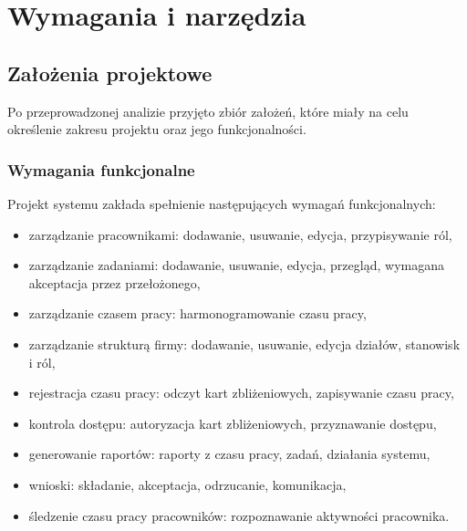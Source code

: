 \chapter{Wymagania i narzędzia}
\label{ch:wymagania-i-narzedzia}


\section{Założenia projektowe}


Po przeprowadzonej analizie przyjęto zbiór założeń, które miały na celu określenie zakresu projektu oraz jego funkcjonalności.

\subsection{Wymagania funkcjonalne}

Projekt systemu zakłada spełnienie następujących wymagań funkcjonalnych:


\begin{itemize}
    \item zarządzanie pracownikami: dodawanie, usuwanie, edycja, przypisywanie ról,
    \item zarządzanie zadaniami: dodawanie, usuwanie, edycja, przegląd, wymagana akceptacja przez przełożonego,
    \item zarządzanie czasem pracy: harmonogramowanie czasu pracy,
    \item zarządzanie strukturą firmy: dodawanie, usuwanie, edycja działów, stanowisk i ról,
    \item rejestracja czasu pracy: odczyt kart zbliżeniowych, zapisywanie czasu pracy,
    \item kontrola dostępu: autoryzacja kart zbliżeniowych, przyznawanie dostępu,
    \item generowanie raportów: raporty z czasu pracy, zadań, działania systemu,
    \item wnioski: składanie, akceptacja, odrzucanie, komunikacja,
    \item śledzenie czasu pracy pracowników: rozpoznawanie aktywności pracownika.
\end{itemize}
\newpage
